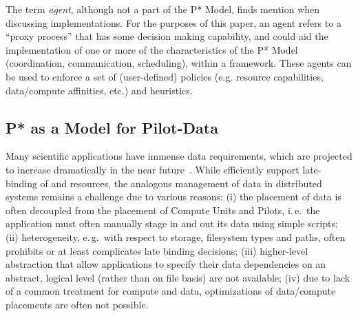 \documentclass[conference]{IEEEtran}
\begin{document}
The term {\it agent}, although not a part of the P* Model, finds
mention when discussing implementations. For the purposes of this
paper, an agent refers to a ``proxy process'' 
that has some decision making capability, and could aid the
implementation of one or more of the characteristics of the P* Model
(coordination, communication, scheduling), within a \pilotjob
framework.  These agents can be used to enforce a set of
(user-defined) policies (e.g.  resource capabilities, data/compute
affinities, etc.) and heuristics.




\subsection{P* as a Model for Pilot-Data}
\label{sec:pilot-data}




Many scientific applications have immense data requirements, which are
projected to increase dramatically in the near future~\cite{hey2009}. 
While \pilotjobs efficiently support late-binding of
\I{\computeunits} and resources, the analogous management of data in
distributed systems remains a challenge due to various reasons: (i) the
placement of data is often decoupled from the placement of Compute Units and
Pilots, i.\,e.\ the application must often manually stage in and out its data
using simple scripts; (ii) heterogeneity, e.\,g.\ with respect to storage,
filesystem types and paths, often prohibits or at least complicates late
binding decisions; (iii) higher-level abstraction that allow applications to
specify their data dependencies on an abstract, logical level (rather than on
file basis) are not available; (iv) due to lack of a common treatment for
compute and data, optimizations of data/compute placements are often not
possible.
\end{document}
